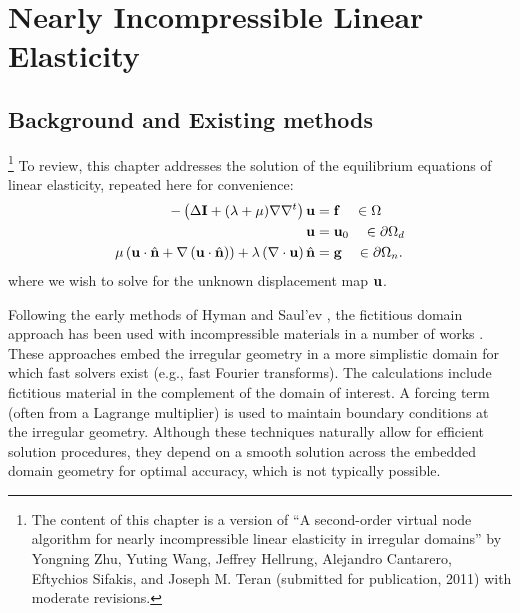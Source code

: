 %

\chapter{Nearly Incompressible Linear Elasticity} \label{chap:partII.LE}

\section{Background and Existing methods} \label{sec:chap5.background}

\footnote{The content of this chapter is a version of ``A second-order virtual node algorithm for nearly incompressible linear elasticity in irregular domains'' by Yongning Zhu, Yuting Wang, Jeffrey Hellrung, Alejandro Cantarero, Eftychios Sifakis, and Joseph M. Teran (submitted for publication, 2011) with moderate revisions.}
To review, this chapter addresses the solution of the equilibrium equations of linear elasticity, repeated here for convenience:
\begin{subequations} \label{eq:chap5.LE}
\begin{align}
-\left( \Delta \mathbf{I} + (\lambda + \mu) \nabla \nabla^t \right) \mathbf{u} & = \mathbf{f} \quad \in \Omega \label{eq:chap5.LE.PDE} \\
\mathbf{u} & = \mathbf{u}_0 \quad \in \partial\Omega_d \label{eq:chap5.LE.D} \\
\mu \left( \mathbf{u} \cdot \hat{\mathbf{n}} + \nabla \left( \mathbf{u} \cdot \hat{\mathbf{n}} \right) \right) + \lambda \left( \nabla \cdot \mathbf{u} \right) \hat{\mathbf{n}} & = \mathbf{g} \quad \in \partial\Omega_n \label{eq:chap5.LE.N}.
\end{align}
\end{subequations}
where we wish to solve for the unknown displacement map $\mathbf{u}$.

Following the early methods of Hyman \cite{Hyman52} and Saul'ev \cite{Saul'ev63}, the fictitious domain approach has been used with incompressible materials in a number of works \cite{Bertrand97, Glowinski94b, Glowinski99, Glowinski01, Biros04, Parussini08, Rutka08, Parussini09, Teran09}. These approaches embed the irregular geometry in a more simplistic domain for which fast solvers exist (e.g., fast Fourier transforms). The calculations include fictitious material in the complement of the domain of interest. A forcing term (often from a Lagrange multiplier) is used to maintain boundary conditions at the irregular geometry. Although these techniques naturally allow for efficient solution procedures, they depend on a smooth solution across the embedded domain geometry for optimal accuracy, which is not typically possible.

